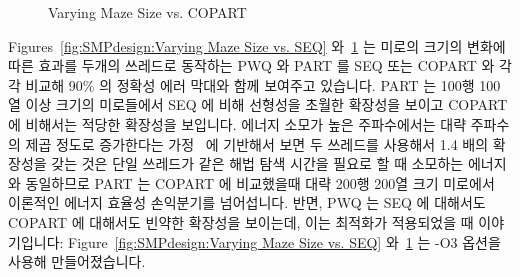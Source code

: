 \begin{figure}[tb]
\centering
{}
\caption{Varying Maze Size vs. COPART}
\label{fig:SMPdesign:Varying Maze Size vs. COPART}
\end{figure}

Figures~\ref{fig:SMPdesign:Varying Maze Size vs. SEQ}
와~\ref{fig:SMPdesign:Varying Maze Size vs. COPART} 는 미로의 크기의 변화에
따른 효과를 두개의 쓰레드로 동작하는 PWQ 와 PART 를 SEQ 또는 COPART 와 각각
비교해 90\% 의 정확성 에러 막대와 함께 보여주고 있습니다.
PART 는 100행 100열 이상 크기의 미로들에서 SEQ 에 비해 선형성을 초월한 확장성을
보이고 COPART 에 비해서는 적당한 확장성을 보입니다.
에너지 소모가 높은 주파수에서는 대략 주파수의 제곱 정도로 증가한다는
가정~\cite{TrevorMudge2000Power} 에 기반해서 보면 두 쓰레드를 사용해서 1.4 배의
확장성을 갖는 것은 단일 쓰레드가 같은 해법 탐색 시간을 필요로 할 때 소모하는
에너지와 동일하므로 PART 는 COPART 에 비교했을때 대략 200행 200열 크기 미로에서
이론적인 에너지 효율성 손익분기를 넘어섭니다.
반면, PWQ 는 SEQ 에 대해서도 COPART 에 대해서도 빈약한 확장성을 보이는데, 이는
최적화가 적용되었을 때 이야기입니다: Figure~\ref{fig:SMPdesign:Varying Maze
Size vs. SEQ}
와~\ref{fig:SMPdesign:Varying Maze Size vs. COPART} 는 -O3 옵션을 사용해
만들어졌습니다.
\iffalse

